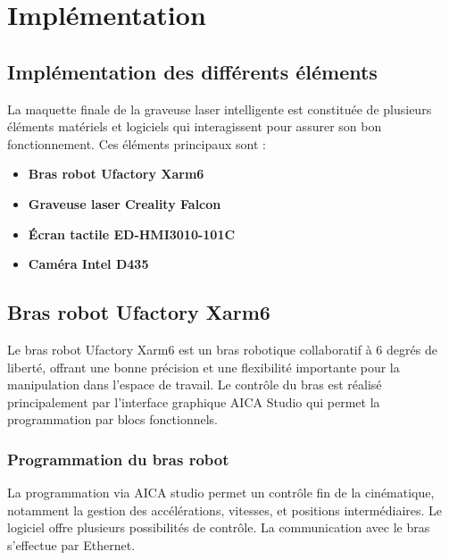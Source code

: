 \chapter{Implémentation}

\section{Implémentation des différents éléments}

La maquette finale de la graveuse laser intelligente est constituée de plusieurs éléments matériels et logiciels qui interagissent pour assurer son bon fonctionnement. Ces éléments principaux sont :

\begin{itemize}
    \item \textbf{Bras robot Ufactory Xarm6}
    \item \textbf{Graveuse laser Creality Falcon}
    \item \textbf{Écran tactile ED-HMI3010-101C}
    \item \textbf{Caméra Intel D435}
\end{itemize}

\section{Bras robot Ufactory Xarm6}

Le bras robot Ufactory Xarm6 est un bras robotique collaboratif à 6 degrés de liberté, offrant une bonne précision et une flexibilité importante pour la manipulation dans l’espace de travail. Le contrôle du bras est réalisé principalement par l’interface graphique AICA Studio qui permet la programmation par blocs fonctionnels.

\subsection{Programmation du bras robot}
La programmation via AICA studio permet un contrôle fin de la cinématique, notamment la gestion des accélérations, vitesses, et positions intermédiaires. Le logiciel offre plusieurs possibilités de contrôle. La communication avec le bras s’effectue par Ethernet.

